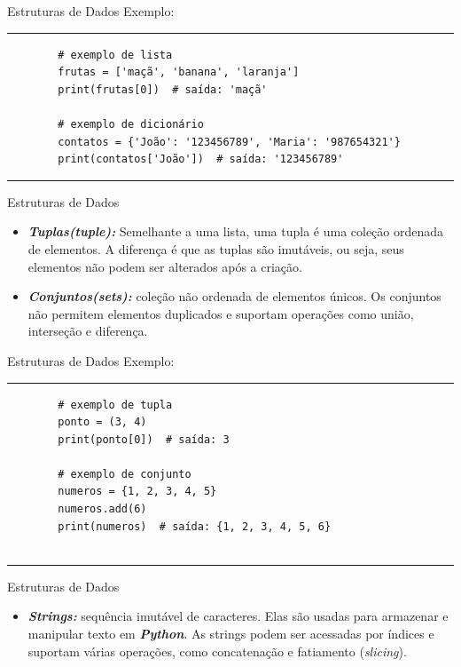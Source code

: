 \documentclass{beamer}
\begin{document}
\begin{frame}[fragile]{Estruturas de Dados}
	Exemplo:
	\rule{\textwidth}{1pt}
	\scriptsize
	\begin{verbatim}
		# exemplo de lista
		frutas = ['maçã', 'banana', 'laranja']
		print(frutas[0])  # saída: 'maçã'
		
		# exemplo de dicionário
		contatos = {'João': '123456789', 'Maria': '987654321'}
		print(contatos['João'])  # saída: '123456789'
	\end{verbatim}
	\rule{\textwidth}{1pt}
\end{frame}

\begin{frame}[fragile]{Estruturas de Dados}
	\begin{itemize}
		\item \textbf{\textit{Tuplas(tuple):}} Semelhante a uma lista, uma tupla é uma coleção ordenada de elementos. A diferença é que as tuplas são imutáveis, ou seja, seus elementos não podem ser alterados após a criação.
		\item \textbf{\textit{Conjuntos(sets):}} coleção não ordenada de elementos únicos. Os conjuntos não permitem elementos duplicados e suportam operações como união, interseção e diferença.
	\end{itemize}
\end{frame}

\begin{frame}[fragile]{Estruturas de Dados}
	Exemplo:
	\rule{\textwidth}{1pt}
	\scriptsize
	\begin{verbatim}
		# exemplo de tupla
		ponto = (3, 4)
		print(ponto[0])  # saída: 3
		
		# exemplo de conjunto
		numeros = {1, 2, 3, 4, 5}
		numeros.add(6)
		print(numeros)  # saída: {1, 2, 3, 4, 5, 6}
		
	\end{verbatim}
	\rule{\textwidth}{1pt}
\end{frame}

\begin{frame}[fragile]{Estruturas de Dados}
	\begin{itemize}
		\item \textbf{\textit{Strings:}} sequência imutável de caracteres. Elas são usadas para armazenar e manipular texto em \textbf{\textit{Python}}. As strings podem ser acessadas por índices e suportam várias operações, como concatenação e fatiamento (\textit{slicing}).
	\end{itemize}
\end{frame}
\end{document}
